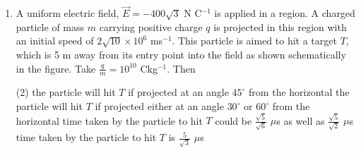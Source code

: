 
\begin{enumerate}
    \item A uniform electric field, $\vec{E} = -400\sqrt{3}$ N C$^{-1}$ is applied in a region. A charged particle of mass $m$ carrying positive charge $q$ is projected in this region with an initial speed of $2\sqrt{10} \times 10^6$ ms$^{-1}$. This particle is aimed to hit a target $T$, which is 5 m away from its entry point into the field as shown schematically in the figure. Take $\frac{q}{m} = 10^{10}$ Ckg$^{-1}$. Then
    \begin{tasks}(2)
        \task the particle will hit $T$ if projected at an angle $45^\circ$ from the horizontal
        \task the particle will hit $T$ if projected either at an angle $30^\circ$ or $60^\circ$ from the horizontal
        \task time taken by the particle to hit $T$ could be $\frac{\sqrt{5}}{\sqrt{6}}$ $\mu$s as well as $\frac{\sqrt{5}}{\sqrt{2}}$ $\mu$s
        \task time taken by the particle to hit $T$ is $\frac{5}{\sqrt{3}}$ $\mu$s
    \end{tasks}
\end{enumerate}
\begin{center}
\end{center}
